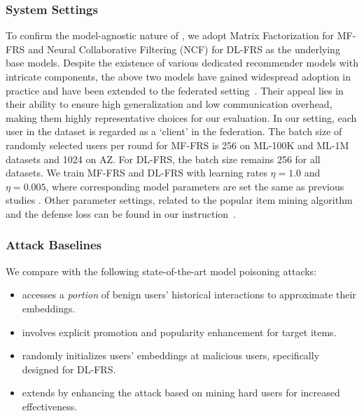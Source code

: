 \subsubsection{System Settings}

To confirm the model-agnostic nature of \model{}, we adopt Matrix Factorization \cite{BPR} for MF-FRS and Neural Collaborative Filtering (NCF) \cite{NCF} for DL-FRS as the underlying base models. Despite the existence of various dedicated recommender models with intricate components, the above two models have gained widespread adoption in practice and have been extended to the federated setting~\cite{fedrecattack,pipattack,a-hum}. Their appeal lies in their ability to ensure high generalization and low communication overhead, making them highly representative choices for our evaluation.
In our setting, each user in the dataset is regarded as a `client' in the federation. 
The batch size of randomly selected users per round for MF-FRS is 256 on ML-100K and ML-1M datasets and 1024 on AZ. For DL-FRS, the batch size remains 256 for all datasets.
We train MF-FRS and DL-FRS with learning rates $\eta=1.0$ and $\eta=0.005$, where corresponding model parameters are set the same as previous studies \cite{fedrecattack,a-hum}.
Other parameter settings, related to the popular item mining algorithm and the defense loss can be found in our instruction~\cite{github-pieck}.

\subsubsection{Attack Baselines}

We compare \model{} with the following state-of-the-art model poisoning attacks:

\begin{itemize}[leftmargin=*]

\item \FRA{} \cite{fedrecattack} accesses a \emph{portion} of benign users' historical interactions to approximate their embeddings.

\item \PIP{} \cite{pipattack} involves explicit promotion and popularity enhancement for target items.

\item \ARA{} \cite{a-hum} randomly initializes users' embeddings at malicious users, specifically designed for DL-FRS.

\item \AHUM{} \cite{a-hum} extends \ARA{} by enhancing the attack based on mining hard users for increased effectiveness.

\end{itemize}

